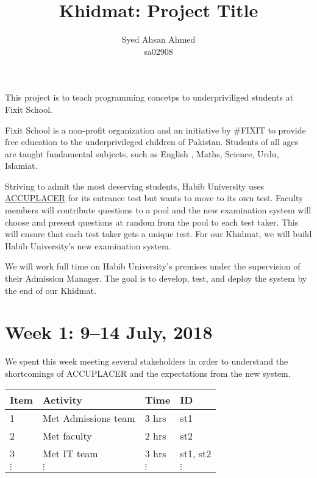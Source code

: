 \documentclass{article}
\title {Khidmat: Project Title}
\author{
  Syed Ahsan Ahmed\\ sa02908
}
\date{}
\begin{document}
\maketitle


This project is to teach programming concetps to underpriviliged students at Fixit School.

Fixit School is a non-profit organization and an initiative by #FIXIT to provide free education to the underprivileged children of Pakistan. Students of all ages are taught fundamental subjects, such as English , Maths, Science, Urdu, Islamiat. 

Striving to admit the most deserving students, Habib University uses \href{https://accuplacer.collegeboard.org}{ACCUPLACER} for its entrance test but wants to move to its own test. Faculty members will contribute questions to a pool and the new examination system will choose and present questions at random from the pool to each test taker. This will ensure that each test taker gets a unique test. For our Khidmat, we will build Habib University's new examination system.

We will work full time on Habib University's premises under the supervision of their Admission Manager. The goal is to develop, test, and deploy the system by the end of our Khidmat.

\newpage %
\section*{Week 1: 9--14 July, 2018}

We spent this week meeting several stakeholders in order to understand the shortcomings of ACCUPLACER and the expectations from the new system.

\begin{tabular}{|l|l|l|l|}
  \hline
  Item 	& Activity & Time & ID \\\hline\hline
  1	& Met Admissions team & 3 hrs & st1 \\\hline
  2	& Met faculty & 2 hrs & st2 \\\hline
  3	& Met IT team & 3 hrs & st1, st2 \\\hline
  $\vdots$ & $\vdots$ & $\vdots$ & $\vdots$ \\\hline
\end{tabular}
\end{document}
